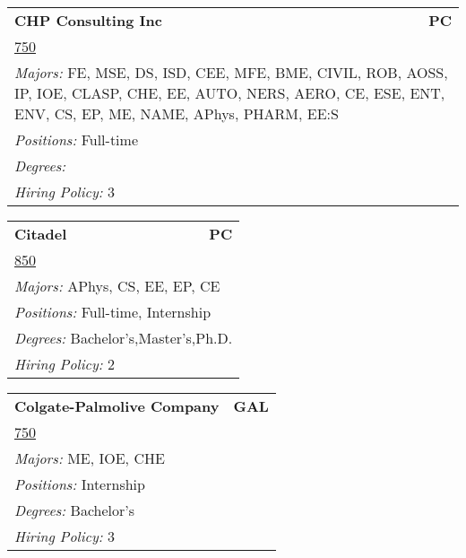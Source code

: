 \documentclass[twoside]{article}
\begin{document}
\begin{center}
\begin{multicols}{3}
\begin{FlushLeft}
\begin{minipage}{\columnwidth}\begin{tabularx}{.95\columnwidth}{Xr}
                 {\Large\bf CHP Consulting Inc} & {\Large\bf PC}\\
    \multicolumn{2}{p{.95\columnwidth}}{\url{750}}\\
    \multicolumn{2}{p{.95\columnwidth}}{\emph{Majors:} FE, MSE, DS, ISD, CEE, MFE, BME, CIVIL, ROB, AOSS, IP, IOE, CLASP, CHE, EE, AUTO, NERS, AERO, CE, ESE, ENT, ENV, CS, EP, ME, NAME, APhys, PHARM, EE:S}\\
    \multicolumn{2}{p{.95\columnwidth}}{\emph{Positions:} Full-time}\\
    \multicolumn{2}{p{.95\columnwidth}}{\emph{Degrees:} }\\
    \multicolumn{2}{p{.95\columnwidth}}{\emph{Hiring Policy:} 3}\\
    \end{tabularx}
    
\end{minipage}
 
\begin{minipage}{\columnwidth}\begin{tabularx}{.95\columnwidth}{Xr}
                 {\Large\bf Citadel} & {\Large\bf PC}\\
    \multicolumn{2}{p{.95\columnwidth}}{\url{850}}\\
    \multicolumn{2}{p{.95\columnwidth}}{\emph{Majors:} APhys, CS, EE, EP, CE}\\
    \multicolumn{2}{p{.95\columnwidth}}{\emph{Positions:} Full-time, Internship}\\
    \multicolumn{2}{p{.95\columnwidth}}{\emph{Degrees:} Bachelor's,Master's,Ph.D.}\\
    \multicolumn{2}{p{.95\columnwidth}}{\emph{Hiring Policy:} 2}\\
    \end{tabularx}
    
\end{minipage}
 
\begin{minipage}{\columnwidth}\begin{tabularx}{.95\columnwidth}{Xr}
                 {\Large\bf Colgate-Palmolive Company} & {\Large\bf GAL}\\
    \multicolumn{2}{p{.95\columnwidth}}{\url{750}}\\
    \multicolumn{2}{p{.95\columnwidth}}{\emph{Majors:} ME, IOE, CHE}\\
    \multicolumn{2}{p{.95\columnwidth}}{\emph{Positions:} Internship}\\
    \multicolumn{2}{p{.95\columnwidth}}{\emph{Degrees:} Bachelor's}\\
    \multicolumn{2}{p{.95\columnwidth}}{\emph{Hiring Policy:} 3}\\
    \end{tabularx}
    

\end{minipage}
\end{FlushLeft}
\end{multicols}
\end{center}
\end{document}
